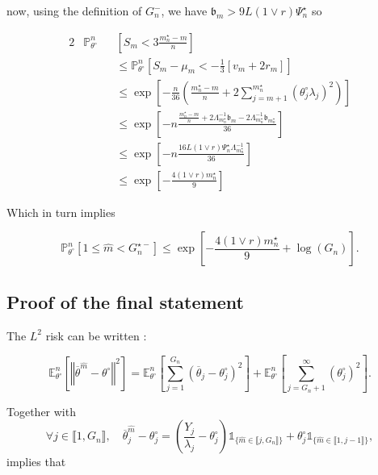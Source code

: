 now, using the definition of $G_{n}^{-}$, we have $\mathfrak{b}_{m} > 9 L \left(1 \vee r\right)\Psi_{n}^{\star}$ so

\begin{alignat*}{2}
& \mathds{P}_{\theta^{\circ}}^{n}&&\left[S_{m} < 3 \frac{m_{n}^{\star} - m}{n}\right]\\
& && \leq \mathds{P}_{\theta^{\circ}}^{n}\left[S_{m} - \mu_{m} < - \frac{1}{3} \left[v_{m} + 2 r_{m}\right]\right]\\
& && \leq \exp\left[- \frac{n}{36}\left(\frac{m_{n}^{\star} - m}{n} + 2 \sum\limits_{j = m + 1}^{m_{n}^{\star}}\left(\theta^{\circ}_{j}\lambda_{j}\right)^{2}\right)\right]\\
& && \leq \exp\left[- n \frac{\frac{m_{n}^{\star} - m}{n} + 2 \Lambda_{m_{n}^{\star}}^{-1}\mathfrak{b}_{m} - 2 \Lambda_{m_{n}^{\star}}^{-1}\mathfrak{b}_{m_{n}^{\star}}}{36}\right]\\
& && \leq \exp\left[- n\frac{16 L \left(1 \vee r\right) \Psi_{n}^{\star} \Lambda_{m_{n}^{\star}}^{-1}}{36}\right]\\
& && \leq \exp \left[ - \frac{4 \left(1 \vee r\right)m_{n}^{\star}}{9} \right]
\end{alignat*}

Which in turn implies

\[\mathds{P}_{\theta^{\circ}}^{n}\left[1 \leq \widehat{m} < G_{n}^{\star-}\right] \leq \exp\left[ - \frac{4 \left(1 \vee r\right) m_{n}^{\star}}{9} + \log\left(G_{n}\right)\right].\]

\subsection{Proof of the final statement}


The $L^{2}$ risk can be written :

\[\mathds{E}_{\theta^{\circ}}^{n}\left[\left\Vert \overline{\theta}^{\widehat{m}} - \theta^{\circ} \right\Vert^{2}\right] = \mathds{E}_{\theta^{\circ}}^{n}\left[\sum\limits_{j = 1}^{G_{n}} \left( \overline{\theta}_{j} - \theta^{\circ}_{j} \right)^{2}\right] + \mathds{E}_{\theta^{\circ}}^{n}\left[\sum\limits_{j = G_{n} + 1}^{\infty} \left(\theta^{\circ}_{j}\right)^{2}\right].\]

Together with
\[\forall j \in \llbracket 1, G_{n} \rrbracket, \quad \overline{\theta}^{\widehat{m}}_{j} - \theta^{\circ}_{j} = \left(\frac{Y_{j}}{\lambda_{j}} - \theta^{\circ}_{j}\right) \mathds{1}_{\{\widehat{m} \in \llbracket j, G_{n} \rrbracket\}} + \theta^{\circ}_{j} \mathds{1}_{\{\widehat{m} \in \llbracket 1, j-1 \rrbracket\}},\]
implies that

